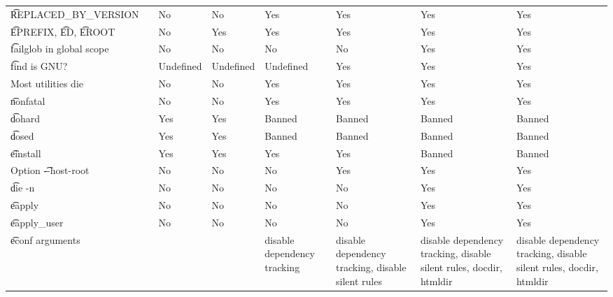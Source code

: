 \begin{landscape}
\begin{longtable}{llP{7.5em}P{7.5em}P{7.5em}P{7.5em}P{7.5em}P{7.5em}}
\t{REPLACED_BY_VERSION} &  &
    No & No & Yes & Yes & Yes & Yes \\

\t{EPREFIX}, \t{ED}, \t{EROOT} &  &
    No & Yes & Yes & Yes & Yes & Yes \\

\t{failglob} in global scope &  &
    No & No & No & No & Yes & Yes \\

\t{find} is GNU? &  &
    Undefined & Undefined & Undefined & Yes & Yes & Yes \\

Most utilities die &  &
    No & No & Yes & Yes & Yes & Yes \\

\t{nonfatal} &  &
    No & No & Yes & Yes & Yes & Yes \\

\t{dohard} &  &
    Yes & Yes & Banned & Banned & Banned & Banned \\

\t{dosed} &  &
    Yes & Yes & Banned & Banned & Banned & Banned \\

\t{einstall} &  &
    Yes & Yes & Yes & Yes & Banned & Banned \\

Option \t{-{}-host-root} &  &
    No & No & No & Yes & Yes & Yes \\

\t{die -n} &  &
    No & No & No & No & Yes & Yes \\

\t{eapply} &  &
    No & No & No & No & Yes & Yes \\

\t{eapply_user} &  &
    No & No & No & No & Yes & Yes \\

\t{econf} arguments &  &
    &  & disable dependency tracking &
    disable dependency tracking, disable silent rules &
    disable dependency tracking, disable silent rules, docdir, htmldir &
    disable dependency tracking, disable silent rules, docdir, htmldir \\


\end{longtable}
\end{landscape}
